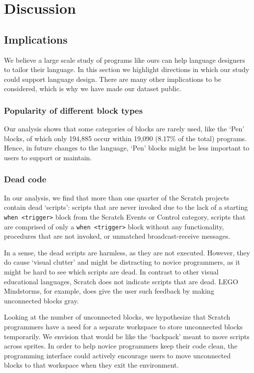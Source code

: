 \documentclass{sig-alternate}
\begin{document}
\section{Discussion}
\label{sec:discussion}
\subsection{Implications}
We believe a large scale study of programs like ours can help language designers to tailor their language. In this section we highlight directions in which our study could support language design. There are many other implications to be considered, which is why we have made our dataset public.

\subsubsection{Popularity of different block types}
Our analysis shows that some categories of blocks are rarely used, like the `Pen' blocks, of which only 194,885 occur within 19,090 (8.17\% of the total) programs. Hence, in future changes to the language, `Pen' blocks might be less important to users to support or maintain. 

\subsubsection{Dead code}
In our analysis, we find that more than one quarter of the Scratch projects contain dead `scripts': scripts that are never invoked due to the lack of a starting \texttt{when <trigger>} block from the Scratch Events or Control category, scripts that are comprised of only a \texttt{when <trigger>} block without any functionality, procedures that are not invoked, or unmatched broadcast-receive messages.

In a sense, the dead scripts are harmless, as they are not executed. However, they do cause `visual clutter' and might be distracting to novice programmers, as it might be hard to see which scripts are dead. In contrast to other visual educational languages, Scratch does not indicate scripts that are dead. LEGO Mindstorms, for example, does give the user such feedback by making unconnected blocks gray. 

Looking at the number of unconnected blocks, we hypothesize that Scratch programmers have a need for a separate workspace to store unconnected blocks temporarily. We envision that would be like the `backpack' meant to move scripts across sprites. In order to help novice programmers keep their code clean, the programming interface could actively encourage users to move unconnected blocks to that workspace when they exit the environment.
\end{document}

